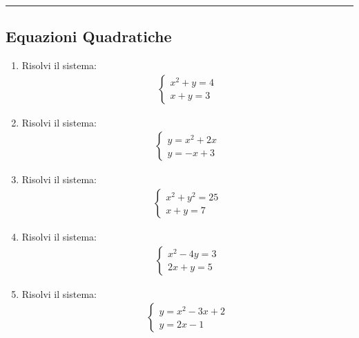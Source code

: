 \documentclass[letterpaper,10pt,italian]{jupyterBook}
\begin{document}
\bigskip\hrule\bigskip



\subsection{Equazioni Quadratiche}
\label{\detokenize{ch/algebra/real-n-algebra:equazioni-quadratiche}}\begin{enumerate}
%
\item {} 
\sphinxAtStartPar
Risolvi il sistema:
\begin{equation*}
\begin{split}
    \begin{cases}
    x^2 + y = 4 \\
    x + y = 3
    \end{cases}
    \end{split}
\end{equation*}
\item {} 
\sphinxAtStartPar
Risolvi il sistema:
\begin{equation*}
\begin{split}
    \begin{cases}
    y = x^2 + 2x \\
    y = -x + 3
    \end{cases}
    \end{split}
\end{equation*}
\item {} 
\sphinxAtStartPar
Risolvi il sistema:
\begin{equation*}
\begin{split}
    \begin{cases}
    x^2 + y^2 = 25 \\
    x + y = 7
    \end{cases}
    \end{split}
\end{equation*}
\item {} 
\sphinxAtStartPar
Risolvi il sistema:
\begin{equation*}
\begin{split}
    \begin{cases}
    x^2 - 4y = 3 \\
    2x + y = 5
    \end{cases}
    \end{split}
\end{equation*}
\item {} 
\sphinxAtStartPar
Risolvi il sistema:
\begin{equation*}
\begin{split}
    \begin{cases}
    y = x^2 - 3x + 2 \\
    y = 2x - 1
    \end{cases}
    \end{split}
\end{equation*}
\end{enumerate}
\end{document}
